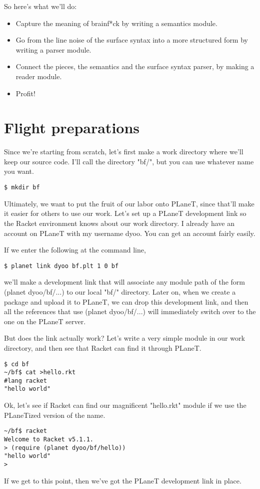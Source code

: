 \documentclass{article}
\begin{document}
So here’s what we’ll do:
\begin{itemize}
\item Capture the meaning of brainf*ck by writing a semantics module.

\item Go from the line noise of the surface syntax into a more structured form by writing a parser module.

\item Connect the pieces, the semantics and the surface syntax parser, by making a reader module.

\item Profit!
\end{itemize}


\section{Flight preparations}
Since we’re starting from scratch, let’s first make a work directory where we’ll keep our source code. I’ll call the directory "bf/", but you can use whatever name you want.
\begin{verbatim}
$ mkdir bf
\end{verbatim}
Ultimately, we want to put the fruit of our labor onto PLaneT, since that’ll make it easier for others to use our work. Let’s set up a PLaneT development link so the Racket environment knows about our work directory. I already have an account on PLaneT with my username dyoo. You can get an account fairly easily.

If we enter the following at the command line,
\begin{verbatim}
$ planet link dyoo bf.plt 1 0 bf
\end{verbatim}
we’ll make a development link that will associate any module path of the form (planet dyoo/bf/...) to our local "bf/" directory. Later on, when we create a package and upload it to PLaneT, we can drop this development link, and then all the references that use (planet dyoo/bf/...) will immediately switch over to the one on the PLaneT server.


But does the link actually work? Let’s write a very simple module in our work directory, and then see that Racket can find it through PLaneT.
\begin{verbatim}
$ cd bf
~/bf$ cat >hello.rkt
#lang racket
"hello world"
\end{verbatim}
Ok, let’s see if Racket can find our magnificent "hello.rkt" module if we use the PLaneTized version of the name.
\begin{verbatim}
~/bf$ racket
Welcome to Racket v5.1.1.
> (require (planet dyoo/bf/hello))
"hello world"
>
\end{verbatim}
If we get to this point, then we’ve got the PLaneT development link in place.
\end{document}
